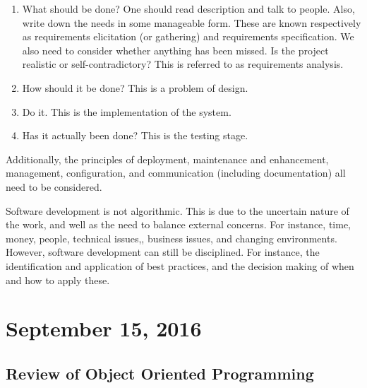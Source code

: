 \documentclass[11pt]{article}
\theoremstyle{plain} %
\theoremstyle{definition}
\theoremstyle{example}
\theoremstyle{remark}
\begin{document}
\begin{enumerate}

\item What should be done? One should read description and talk to people. Also, write down the needs in some manageable form. These are known respectively as requirements elicitation (or gathering) and requirements specification. We also need to consider whether anything has been missed. Is the project realistic or self-contradictory? This is referred to as requirements analysis. 
\item How should it be done? This is a problem of design.
\item Do it. This is the implementation of the system. 
\item Has it actually been done? This is the testing stage.




\end{enumerate}



Additionally, the principles of deployment, maintenance and enhancement, management, configuration, and communication (including documentation) all need to be considered. 

Software development is not algorithmic. This is due to the uncertain nature of the work, and well as the need to balance external concerns. For instance, time, money, people, technical issues,, business issues, and changing environments. However, software development can still be disciplined. For instance, the identification and application of best practices, and the decision making of when and how to apply these. 








\section{September 15, 2016}


\subsection{Review of Object Oriented Programming}
\end{document}
